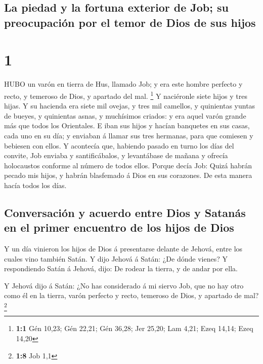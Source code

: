 \hypertarget{la-piedad-y-la-fortuna-exterior-de-job-su-preocupaciuxf3n-por-el-temor-de-dios-de-sus-hijos}{%
\subsection{La piedad y la fortuna exterior de Job; su preocupación por
el temor de Dios de sus
hijos}\label{la-piedad-y-la-fortuna-exterior-de-job-su-preocupaciuxf3n-por-el-temor-de-dios-de-sus-hijos}}

\hypertarget{section}{%
\section{1}\label{section}}

 HUBO un varón en tierra de Hus, llamado Job; y era este
hombre perfecto y recto, y temeroso de Dios, y apartado del mal.
\footnote{\textbf{1:1} Gén 10,23; Gén 22,21; Gén 36,28; Jer 25,20; Lam
  4,21; Ezeq 14,14; Ezeq 14,20}  Y naciéronle siete hijos y
tres hijas.  Y su hacienda era siete mil ovejas, y tres mil
camellos, y quinientas yuntas de bueyes, y quinientas asnas, y
muchísimos criados: y era aquel varón grande más que todos los
Orientales.  E iban sus hijos y hacían banquetes en sus
casas, cada uno en su día; y enviaban á llamar sus tres hermanas, para
que comiesen y bebiesen con ellos.  Y acontecía que,
habiendo pasado en turno los días del convite, Job enviaba y
santificábalos, y levantábase de mañana y ofrecía holocaustos conforme
al número de todos ellos. Porque decía Job: Quizá habrán pecado mis
hijos, y habrán blasfemado á Dios en sus corazones. De esta manera hacía
todos los días.

\hypertarget{conversaciuxf3n-y-acuerdo-entre-dios-y-satanuxe1s-en-el-primer-encuentro-de-los-hijos-de-dios}{%
\subsection{Conversación y acuerdo entre Dios y Satanás en el primer
encuentro de los hijos de
Dios}\label{conversaciuxf3n-y-acuerdo-entre-dios-y-satanuxe1s-en-el-primer-encuentro-de-los-hijos-de-dios}}

 Y un día vinieron los hijos de Dios á presentarse delante
de Jehová, entre los cuales vino también Satán.  Y dijo
Jehová á Satán: ¿De dónde vienes? Y respondiendo Satán á Jehová, dijo:
De rodear la tierra, y de andar por ella.

 Y Jehová dijo á Satán: ¿No has considerado á mi siervo Job,
que no hay otro como él en la tierra, varón perfecto y recto, temeroso
de Dios, y apartado de mal? \footnote{\textbf{1:8} Job 1,1}

